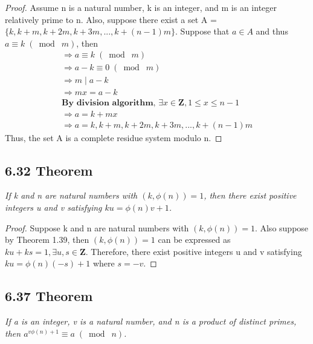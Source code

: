 \documentclass{article}
\begin{document}
\begin{proof}
Assume n is a natural number, k is an integer, and m is an integer relatively prime to n. Also, suppose there exist a set A = $\{k, k+m, k+2m, k+3m,...,k+(n-1)m\}$. Suppose that $a \in A$ and thus $a \equiv k \;(\bmod\; m)$, then
\begin{align*}
    &\Longrightarrow a \equiv k \;(\bmod\; m)&\\
    &\Longrightarrow a - k \equiv 0 \;(\bmod\; m)&\\
    &\Longrightarrow m \mid a - k&\\
    &\Longrightarrow mx = a - k&\\ 
    &\textbf{By division algorithm, $\exists x \in \mathbf{Z}, 1 \leq x \leq n-1$}&\\
    &\Longrightarrow a = k + mx&\\
    &\Longrightarrow a = k, k+m, k+2m, k+3m,...,k+(n-1)m&
\end{align*}
Thus, the set A is a complete residue system modulo n.
\end{proof}

\subsection*{6.32 Theorem} 
\quad \textit{If k and n are natural numbers with $(k,\phi(n))=1$, then there exist positive integers u and v satisfying $ku = \phi(n)v+1$.}

\begin{proof}
Suppose k and n are natural numbers with $(k,\phi(n))=1$. Also suppose by Theorem 1.39, then $(k,\phi(n))=1$ can be expressed as $ku + ks = 1, \exists u,s \in \mathbf{Z}$. Therefore, there exist positive integers u and v satisfying $ku = \phi(n)(-s)+1$ where $s = -v$.
\end{proof}

\subsection*{6.37 Theorem} 
\quad \textit{If a is an integer, v is a natural number, and n is a product of distinct primes, then $a^{v\phi{(n)}+1} \equiv  a \;(\bmod\; n)$.}
\end{document}
